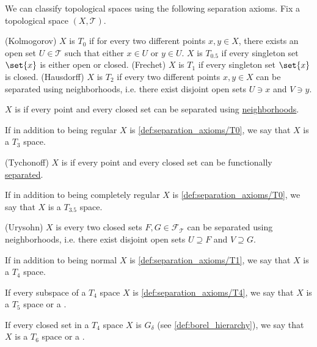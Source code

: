 \begin{definition}\label{def:separation_axioms}
  We can classify topological spaces using the following separation axioms. Fix a topological space \( (X, \mathcal{T}) \).

  \begin{thmenum}
     (Kolmogorov) \( X \) is \( T_0 \) if for every two different points \( x, y \in X \), there exists an open set \( U \in \mathcal{T} \) such that either \( x \in U \) or \( y \in U \).
     \( X \) is \( T_{0.5} \) if every singleton set \( \set{ x } \) is either open or closed.
     (Frechet) \( X \) is \( T_1 \) if every singleton set \( \set{ x } \) is closed.
     (Hausdorff) \( X \) is \( T_2 \) if every two different points \( x, y \in X \) can be separated using neighborhoods, i.e. there exist disjoint open sets \( U \ni x \) and \( V \ni y \).

     \( X \) is  if every point and every closed set can be separated using \hyperref[def:topological_space_separation]{neighborhoods}.

    If in addition to being regular \( X \) is \ref{def:separation_axioms/T0}, we say that \( X \) is a \( T_3 \) space.

     (Tychonoff) \( X \) is  if every point and every closed set can be functionally \hyperref[def:topological_space_separation]{separated}.

    If in addition to being completely regular \( X \) is \ref{def:separation_axioms/T0}, we say that \( X \) is a \( T_{3.5} \) space.

    (Urysohn) \( X \) is  every two closed sets \( F, G \in \mathcal{F}_{\mathcal{T}} \) can be separated using neighborhoods, i.e. there exist disjoint open sets \( U \supseteq F \) and \( V \supseteq G \).

    If in addition to being normal \( X \) is \ref{def:separation_axioms/T1}, we say that \( X \) is a \( T_4 \) space.

     If every subspace of a \( T_4 \) space \( X \) is \ref{def:separation_axioms/T4}, we say that \( X \) is a \( T_5 \) space or a .

     If every closed set in a \( T_4 \) space \( X \) is \( G_\delta \) (see \cref{def:borel_hierarchy}), we say that \( X \) is a \( T_6 \) space or a .
  \end{thmenum}
\end{definition}

